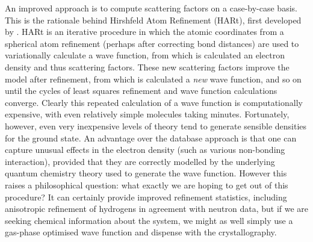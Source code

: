 \begin{refsection}
An improved approach is to compute scattering factors on a case-by-case basis.
This is the rationale behind Hirshfeld Atom Refinement (HARt), first developed by \citeauthor{Jayatilaka2008}.\autocite{Jayatilaka2008}
HARt is an iterative procedure in which the atomic coordinates from a spherical atom refinement (perhaps after correcting  bond distances) are used to variationally calculate a wave function, from which is calculated an electron density and thus scattering factors.
These new scattering factors improve the model after refinement, from which is calculated a \emph{new} wave function, and so on until the cycles of least squares refinement and wave function calculations converge.
Clearly this repeated calculation of a wave function is computationally expensive, with even relatively simple molecules taking minutes.
Fortunately, however, even very inexpensive levels of theory tend to generate sensible densities for the ground state.
An advantage over the database approach is that one can capture unusual effects in the electron density (such as various non-bonding interaction), provided that they are correctly modelled by the underlying quantum chemistry theory used to generate the wave function.
However this raises a philosophical question: what exactly we are hoping to get out of this procedure?
It can certainly provide improved refinement statistics, including anisotropic refinement of hydrogens in agreement with neutron data, but if we are seeking chemical information about the system, we might as well simply use a gas-phase optimised wave function and dispense with the crystallography.


\end{refsection}
